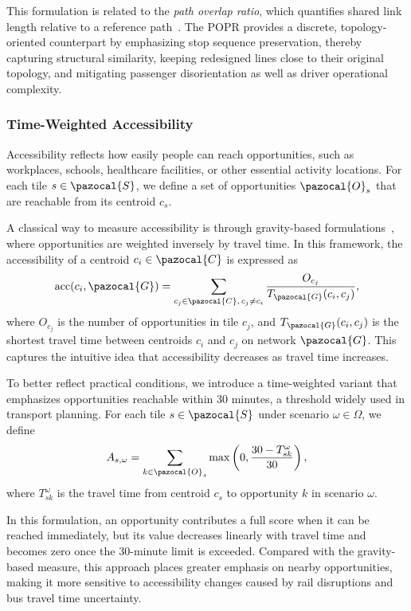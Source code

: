 \documentclass[3p,times,procedia]{elsarticle}
\begin{document}
This formulation is related to the \emph{path overlap ratio}, which quantifies shared link length relative to a reference path~\citep{Lim2005PathOverlap}. The POPR provides a discrete, topology-oriented counterpart by emphasizing stop sequence preservation, thereby capturing structural similarity, keeping redesigned lines close to their original topology, and mitigating passenger disorientation as well as driver operational complexity.

\subsubsection{Time-Weighted Accessibility}\label{sec:TWA}
Accessibility reflects how easily people can reach opportunities, such as workplaces, schools, healthcare facilities, or other essential activity locations. 
%
For each tile $s \in \pazocal{S}$, we define a set of opportunities $\pazocal{O}_s$ that are reachable from its centroid $c_s$.  

A classical way to measure accessibility is through gravity-based formulations~\citep{miller2020measuring}, 
where opportunities are weighted inversely by travel time. 
In this framework, the accessibility of a centroid $c_i \in \pazocal{C}$ is expressed as
\begin{equation}
    \text{acc}(c_i, \pazocal{G}) = \sum_{c_j \in \pazocal{C}, \, c_j \neq c_i} \frac{O_{c_j}}{T_{\pazocal{G}}(c_i, c_j)},
\end{equation}
where $O_{c_j}$ is the number of opportunities in tile $c_j$, 
and $T_{\pazocal{G}}(c_i, c_j)$ is the shortest travel time between centroids $c_i$ and $c_j$ on network $\pazocal{G}$. 
This captures the intuitive idea that accessibility decreases as travel time increases.  

To better reflect practical conditions, we introduce a time-weighted variant that emphasizes opportunities reachable within 30 minutes, 
a threshold widely used in transport planning. 
For each tile $s \in \pazocal{S}$ under scenario $\omega \in \Omega$, we define
\begin{equation}
    A_{s,\omega} = \sum_{k \in \pazocal{O}_s} \max\left(0, \frac{30 - T_{sk}^\omega}{30}\right),
\end{equation}
where $T_{sk}^\omega$ is the travel time from centroid $c_s$ to opportunity $k$ in scenario $\omega$.  

In this formulation, an opportunity contributes a full score when it can be reached immediately, 
but its value decreases linearly with travel time and becomes zero once the 30-minute limit is exceeded. 
Compared with the gravity-based measure, this approach places greater emphasis on nearby opportunities, 
making it more sensitive to accessibility changes caused by rail disruptions and bus travel time uncertainty.
\end{document}
